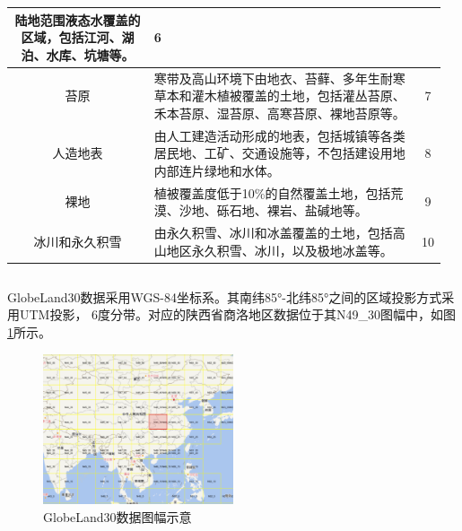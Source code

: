 \documentclass[10pt,aspectratio=169]{beamer} %
\begin{document}
\begin{frame}[c]{\secname}{\subsecname}
\begin{columns}
\begin{table}[htbp]
\begin{tabular}{c| m{24.78em}| c}
	    	\textcolor[rgb]{ .2,  .2,  .2}{陆地范围液态水覆盖的区域，包括江河、湖泊、水库、坑塘等。} &
	    	\textcolor[rgb]{ .2,  .2,  .2}{6}
	    	\\
	    	\hline
	    	\textcolor[rgb]{ .2,  .2,  .2}{苔原} &
	    	\textcolor[rgb]{ .2,  .2,  .2}{寒带及高山环境下由地衣、苔藓、多年生耐寒草本和灌木植被覆盖的土地，包括灌丛苔原、禾本苔原、湿苔原、高寒苔原、裸地苔原等。} &
	    	\textcolor[rgb]{ .2,  .2,  .2}{7}
	    	\\
	    	\hline
	    	\textcolor[rgb]{ .2,  .2,  .2}{人造地表} &
	    	\textcolor[rgb]{ .2,  .2,  .2}{由人工建造活动形成的地表，包括城镇等各类居民地、工矿、交通设施等，不包括建设用地内部连片绿地和水体。} &
	    	\textcolor[rgb]{ .2,  .2,  .2}{8}
	    	\\
	    	\hline
	    	\textcolor[rgb]{ .2,  .2,  .2}{裸地} &
	    	\textcolor[rgb]{ .2,  .2,  .2}{植被覆盖度低于10\%的自然覆盖土地，包括荒漠、沙地、砾石地、裸岩、盐碱地等。} &
	    	\textcolor[rgb]{ .2,  .2,  .2}{9}
	    	\\
	    	\hline
	    	\textcolor[rgb]{ .2,  .2,  .2}{冰川和永久积雪} &
	    	\textcolor[rgb]{ .2,  .2,  .2}{由永久积雪、冰川和冰盖覆盖的土地，包括高山地区永久积雪、冰川，以及极地冰盖等。} &
	    	\textcolor[rgb]{ .2,  .2,  .2}{10}
	    	\\
	    	\hline
	    \end{tabular}%
	\label{Table.main.1}%
\end{table}%
	\end{columns}	
	\end{frame}

	\begin{frame}[c]{\secname}{\subsecname}
		GlobeLand30数据采用WGS-84坐标系。其南纬85$°$-北纬85$°$之间的区域投影方式采用UTM投影， 6度分带。对应的陕西省商洛地区数据位于其N49\_30图幅中，如图\ref{Fig.main.2}所示。
			\begin{figure}[htbp] %
			\centering %
			\includegraphics[width=0.5\textwidth]{images/n49e30.png} 
			\caption{GlobeLand30数据图幅示意} %
			\label{Fig.main.2} %
		\end{figure}
	\end{frame}
\end{document}
